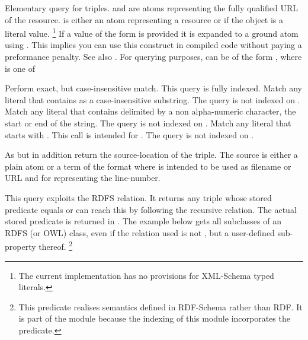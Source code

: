 \documentclass[11pt]{article}
\begin{document}
\begin{description}
Elementary query for triples.   and  are
atoms representing the fully qualified URL of the resource. 
is either an atom representing a resource or  if the
object is a literal value.%
	\footnote{The current implementation has no provisions for
		  XML-Schema typed literals.}
If a value of the form  is provided
it is expanded to a ground atom using . This implies you
can use this construct in compiled code without paying a preformance
penalty.  See also . 
For querying purposes,  can be of the form
, where  is one of
    \begin{description}
    	    Perform exact, but case-insensitive match.  This query is
	    fully indexed.
	    Match any literal that contains  as a case-insensitive
	    substring.  The query is not indexed on .
	    Match any literal that contains  delimited by
	    a non alpha-numeric character, the start or end of the
	    string.  The query is not indexed on .
	    Match any literal that starts with .  This call
	    is intended for .  The query is not
	    indexed on .
    \end{description}

As  but in addition return the source-location of the triple.  The
source is either a plain atom or a term of the format
 where  is intended to be used as
filename or URL and  for representing the line-number.

This query exploits the RDFS  relation.  It 
returns any triple whose stored predicate equals  or
can reach this by following the recursive  relation.
The actual stored predicate is returned in . The example
below gets all subclasses of an RDFS (or OWL) class, even if the
relation used is not , but a user-defined
sub-property thereof.%
	\footnote{This predicate realises semantics defined in
		  RDF-Schema rather than RDF.  It is part of the
		   module because the indexing of
		  this module incorporates the  
		  predicate.}


\end{description}
\end{document}
